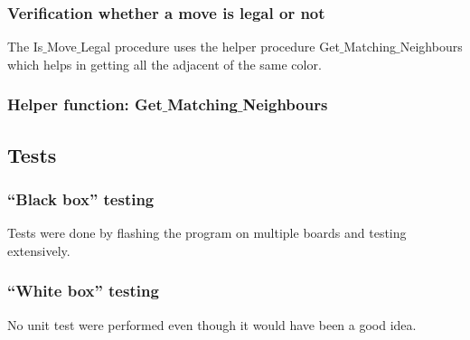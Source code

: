 

\subsubsection{Verification whether a move is legal or not}

The Is$\_$Move$\_$Legal procedure uses the helper procedure Get$\_$Matching$\_$Neighbours which helps in getting all the adjacent \sqs of the same color.



\subsubsection{Helper function: Get$\_$Matching$\_$Neighbours}



\subsection{Tests}

\subsubsection{``Black box'' testing}
Tests were done by flashing the program on multiple boards and testing extensively.
\subsubsection{``White box'' testing}
No unit test were performed even though it would have been a good idea.

\newpage
